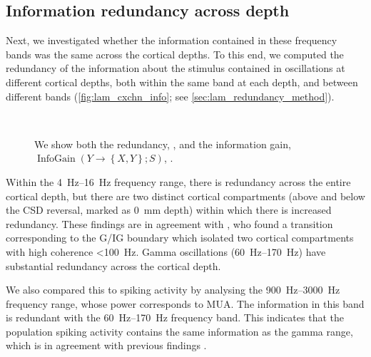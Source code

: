 \subsection{Information redundancy across depth}

Next, we investigated whether the information contained in these frequency bands was the same across the cortical depths.
To this end, we computed the redundancy of the information about the stimulus contained in oscillations at different cortical depths, both within the same band at each depth, and between different bands (\autoref{fig:lam_cxchn_info}; see \autoref{sec:lam_redundancy_method}).

\begin{figure}[htbp]
    \centering
    \hspace*{\fill}
    \hspace*{\fill}
    \\
    \hspace*{\fill}
    \hspace*{\fill}
%
\caption{
We show both the redundancy, \protect{}, and the information gain, $\operatorname{InfoGain}\left(Y\to\left\{X,Y\right\};S\right)$, \protect{}.
}%
\label{fig:lam_cxchn_info}
%
\end{figure}

Within the \SIrange{4}{16}{Hz} frequency range, there is redundancy across the entire cortical depth, but there are two distinct cortical compartments (above and below the \ac{CSD} reversal, marked as \SI{0}{mm} depth) within which there is increased redundancy.
These findings are in agreement with \citet{Maier2010}, who found a transition corresponding to the \ac{G}/\ac{IG} boundary which isolated two cortical compartments with high coherence \SI{<100}{Hz}.
Gamma oscillations (\SIrange{60}{170}{Hz}) have substantial redundancy across the cortical depth.

We also compared this to spiking activity by analysing the  \SIrange{900}{3000}{Hz} frequency range, whose power corresponds to \ac{MUA}. The information in this  band is redundant with the \SIrange{60}{170}{Hz} frequency band.
This indicates that the population spiking activity contains the same information as the gamma range, which is in agreement with previous findings \citep{Belitski2008}.

